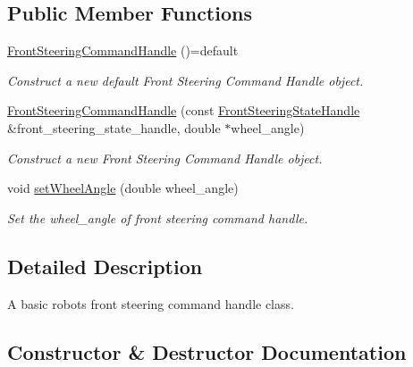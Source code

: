 \subsection*{Public Member Functions}
\begin{DoxyCompactItemize}
\item 
\mbox{\label{classhardware__interface_1_1FrontSteeringCommandHandle_af1dd99ae1cc5910ae741269ed4999164}} 
\hyperlink{classhardware__interface_1_1FrontSteeringCommandHandle_af1dd99ae1cc5910ae741269ed4999164}{Front\+Steering\+Command\+Handle} ()=default
\begin{DoxyCompactList}\small\item\em Construct a new default Front Steering Command Handle object. \end{DoxyCompactList}\item 
\hyperlink{classhardware__interface_1_1FrontSteeringCommandHandle_a6c744347e33e94a5993d78ca8b5f103b}{Front\+Steering\+Command\+Handle} (const \hyperlink{classhardware__interface_1_1FrontSteeringStateHandle}{Front\+Steering\+State\+Handle} \&front\+\_\+steering\+\_\+state\+\_\+handle, double $\ast$wheel\+\_\+angle)
\begin{DoxyCompactList}\small\item\em Construct a new Front Steering Command Handle object. \end{DoxyCompactList}\item 
void \hyperlink{classhardware__interface_1_1FrontSteeringCommandHandle_acd5e7d29e7fe2992244c1cfcda28cede}{set\+Wheel\+Angle} (double wheel\+\_\+angle)
\begin{DoxyCompactList}\small\item\em Set the wheel\+\_\+angle of front steering command handle. \end{DoxyCompactList}\end{DoxyCompactItemize}


\subsection{Detailed Description}
A basic robot\textquotesingle{}s front steering command handle class. 

\subsection{Constructor \& Destructor Documentation}
\mbox{\label{classhardware__interface_1_1FrontSteeringCommandHandle_a6c744347e33e94a5993d78ca8b5f103b}} 
